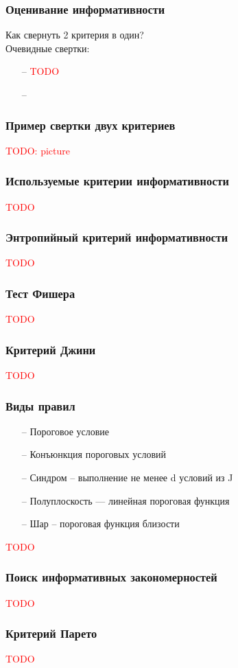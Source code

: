 \documentclass[12pt]{beamer}
\begin{document}
\begin{frame}\frametitle{Оценивание информативности}
	Как свернуть 2 критерия в один?\\
	Очевидные свертки:\\
	\begin{itemize}
		\item[--] \textcolor{red}{TODO}
		\item[--] 
	\end{itemize}
\end{frame}

\begin{frame}\frametitle{Пример свертки двух критериев}
\textcolor{red}{TODO: picture}
\end{frame}

\begin{frame}\frametitle{Используемые критерии информативности}
\textcolor{red}{TODO}
\end{frame}

\begin{frame}\frametitle{Энтропийный критерий информативности}
\textcolor{red}{TODO}
\end{frame}


\begin{frame}\frametitle{Тест Фишера}
\textcolor{red}{TODO}
\end{frame}

\begin{frame}\frametitle{Критерий Джини}
\textcolor{red}{TODO}
\end{frame}

\begin{frame}\frametitle{Виды правил}
\begin{itemize}
\item[--] Пороговое условие
\item[--] Конъюнкция пороговых условий
\item[--] Синдром -- выполнение не менее d условий из J
\item[--] Полуплоскость — линейная пороговая функция
\item[--] Шар -- пороговая функция близости
\end{itemize}
\textcolor{red}{TODO}
\end{frame}

\begin{frame}\frametitle{Поиск информативных закономерностей}
\textcolor{red}{TODO}
\end{frame}

\begin{frame}\frametitle{Критерий Парето}
\textcolor{red}{TODO}
\end{frame}
\end{document}
